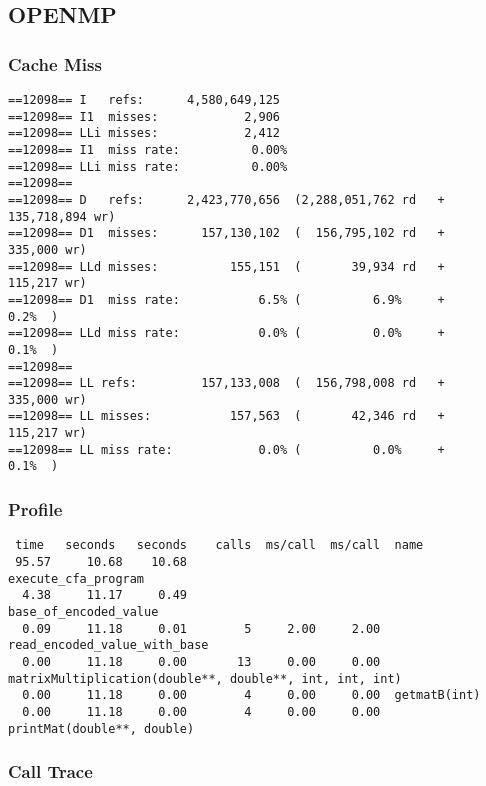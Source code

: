 \documentclass[7pt]{article}
\begin{document}
\subsection{OPENMP}
\subsubsection{Cache Miss}

\begin{verbatim}
==12098== I   refs:      4,580,649,125
==12098== I1  misses:            2,906
==12098== LLi misses:            2,412
==12098== I1  miss rate:          0.00%
==12098== LLi miss rate:          0.00%
==12098==
==12098== D   refs:      2,423,770,656  (2,288,051,762 rd   + 135,718,894 wr)
==12098== D1  misses:      157,130,102  (  156,795,102 rd   +     335,000 wr)
==12098== LLd misses:          155,151  (       39,934 rd   +     115,217 wr)
==12098== D1  miss rate:           6.5% (          6.9%     +         0.2%  )
==12098== LLd miss rate:           0.0% (          0.0%     +         0.1%  )
==12098==
==12098== LL refs:         157,133,008  (  156,798,008 rd   +     335,000 wr)
==12098== LL misses:           157,563  (       42,346 rd   +     115,217 wr)
==12098== LL miss rate:            0.0% (          0.0%     +         0.1%  )

\end{verbatim}

\subsubsection{Profile}

\begin{verbatim}
 time   seconds   seconds    calls  ms/call  ms/call  name
 95.57     10.68    10.68                             execute_cfa_program
  4.38     11.17     0.49                             base_of_encoded_value
  0.09     11.18     0.01        5     2.00     2.00  read_encoded_value_with_base
  0.00     11.18     0.00       13     0.00     0.00  matrixMultiplication(double**, double**, int, int, int)
  0.00     11.18     0.00        4     0.00     0.00  getmatB(int)
  0.00     11.18     0.00        4     0.00     0.00  printMat(double**, double)

\end{verbatim}


\subsubsection{Call Trace}
\end{document}
